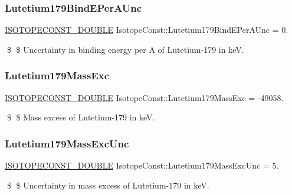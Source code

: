 \subsubsection{\texorpdfstring{Lutetium179\+Bind\+E\+Per\+A\+Unc}{Lutetium179BindEPerAUnc}}
{\footnotesize\ttfamily \mbox{\hyperlink{group___isotope_const-_macros_ga8f45a7272ce02c0b4c65c44636ed719a}{I\+S\+O\+T\+O\+P\+E\+C\+O\+N\+S\+T\+\_\+\+D\+O\+U\+B\+LE}} Isotope\+Const\+::\+Lutetium179\+Bind\+E\+Per\+A\+Unc = 0.}

\$ \$ Uncertainty in binding energy per A of Lutetium-\/179 in keV. \mbox{\label{group___isotope_const-_lutetium-_lu179_ga3d8942d819cbcd9e32ee6bdf21cbe761}} 
\subsubsection{\texorpdfstring{Lutetium179\+Mass\+Exc}{Lutetium179MassExc}}
{\footnotesize\ttfamily \mbox{\hyperlink{group___isotope_const-_macros_ga8f45a7272ce02c0b4c65c44636ed719a}{I\+S\+O\+T\+O\+P\+E\+C\+O\+N\+S\+T\+\_\+\+D\+O\+U\+B\+LE}} Isotope\+Const\+::\+Lutetium179\+Mass\+Exc = -\/49058.}

\$ \$ Mass excess of Lutetium-\/179 in keV. \mbox{\label{group___isotope_const-_lutetium-_lu179_ga760c837b382eb3dece86cbfa6b5bd4d8}} 
\subsubsection{\texorpdfstring{Lutetium179\+Mass\+Exc\+Unc}{Lutetium179MassExcUnc}}
{\footnotesize\ttfamily \mbox{\hyperlink{group___isotope_const-_macros_ga8f45a7272ce02c0b4c65c44636ed719a}{I\+S\+O\+T\+O\+P\+E\+C\+O\+N\+S\+T\+\_\+\+D\+O\+U\+B\+LE}} Isotope\+Const\+::\+Lutetium179\+Mass\+Exc\+Unc = 5.}

\$ \$ Uncertainty in mass excess of Lutetium-\/179 in keV. \mbox{\label{group___isotope_const-_lutetium-_lu179_ga11755cf71c78ce0358a829ee98d11dae}} 
